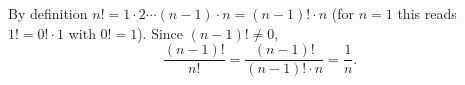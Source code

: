 By definition $n!=1\cdot2\cdots(n-1)\cdot n=(n-1)!\cdot n$ (for $n=1$ this reads $1!=0!\cdot1$ with $0!=1$). Since $(n-1)!\ne0$,
\[
\dfrac{(n-1)!}{n!}=\dfrac{(n-1)!}{(n-1)!\cdot n}=\dfrac{1}{n} .
\]
